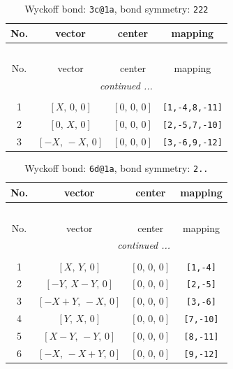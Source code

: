 \documentclass[fleqn,8pt]{jsarticle}
\begin{document}
\renewcommand{\arraystretch}{1.2}
\begin{longtable}{cccc}
\caption{Wyckoff bond: {\tt 3c@1a}, bond symmetry: {\tt 222}}
 \\
 \hline \hline
No. & vector & center & mapping \\ \hline \endfirsthead

\multicolumn{3}{l}{\tablename\ \thetable{}} \\
 \hline \hline
No. & vector & center & mapping \\ \hline \endhead

 \hline \hline
\multicolumn{3}{r}{\footnotesize\it continued ...} \\ \endfoot

 \hline \hline
\multicolumn{3}{r}{} \\ \endlastfoot

1 & $\left[ X,\, 0,\, 0 \right]$ & $\left[ 0,\, 0,\, 0 \right]$ & {\tt [1,-4,8,-11]} \\ \hline
2 & $\left[ 0,\, X,\, 0 \right]$ & $\left[ 0,\, 0,\, 0 \right]$ & {\tt [2,-5,7,-10]} \\ \hline
3 & $\left[ - X,\, - X,\, 0 \right]$ & $\left[ 0,\, 0,\, 0 \right]$ & {\tt [3,-6,9,-12]} \\
\end{longtable}
\renewcommand{\arraystretch}{1.2}
\begin{longtable}{cccc}
\caption{Wyckoff bond: {\tt 6d@1a}, bond symmetry: {\tt 2..}}
 \\
 \hline \hline
No. & vector & center & mapping \\ \hline \endfirsthead

\multicolumn{3}{l}{\tablename\ \thetable{}} \\
 \hline \hline
No. & vector & center & mapping \\ \hline \endhead

 \hline \hline
\multicolumn{3}{r}{\footnotesize\it continued ...} \\ \endfoot

 \hline \hline
\multicolumn{3}{r}{} \\ \endlastfoot

1 & $\left[ X,\, Y,\, 0 \right]$ & $\left[ 0,\, 0,\, 0 \right]$ & {\tt [1,-4]} \\ \hline
2 & $\left[ - Y,\, X - Y,\, 0 \right]$ & $\left[ 0,\, 0,\, 0 \right]$ & {\tt [2,-5]} \\ \hline
3 & $\left[ - X + Y,\, - X,\, 0 \right]$ & $\left[ 0,\, 0,\, 0 \right]$ & {\tt [3,-6]} \\ \hline
4 & $\left[ Y,\, X,\, 0 \right]$ & $\left[ 0,\, 0,\, 0 \right]$ & {\tt [7,-10]} \\ \hline
5 & $\left[ X - Y,\, - Y,\, 0 \right]$ & $\left[ 0,\, 0,\, 0 \right]$ & {\tt [8,-11]} \\ \hline
6 & $\left[ - X,\, - X + Y,\, 0 \right]$ & $\left[ 0,\, 0,\, 0 \right]$ & {\tt [9,-12]} \\
\end{longtable}
\end{document}
